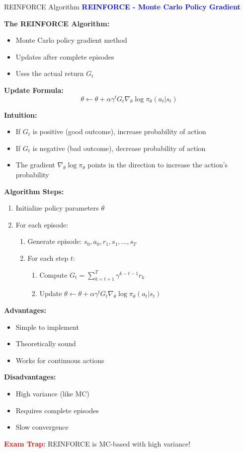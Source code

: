 \documentclass[8pt]{beamer}
\begin{document}
\begin{frame}{REINFORCE Algorithm}
\fontsize{6.5}{7.5}\selectfont
\textcolor{blue}{\textbf{REINFORCE - Monte Carlo Policy Gradient}}

\textbf{The REINFORCE Algorithm:}
\begin{itemize}
\item Monte Carlo policy gradient method
\item Updates after complete episodes
\item Uses the actual return $G_t$
\end{itemize}

\textbf{Update Formula:}
\[
\theta \leftarrow \theta + \alpha \gamma^t G_t \nabla_\theta \log \pi_\theta(a_t|s_t)
\]

\textbf{Intuition:}
\begin{itemize}
\item If $G_t$ is positive (good outcome), increase probability of action
\item If $G_t$ is negative (bad outcome), decrease probability of action
\item The gradient $\nabla_\theta \log \pi_\theta$ points in the direction to increase the action's probability
\end{itemize}

\textbf{Algorithm Steps:}
\begin{enumerate}
\item Initialize policy parameters $\theta$
\item For each episode:
\begin{enumerate}
\item Generate episode: $s_0, a_0, r_1, s_1, ..., s_T$
\item For each step $t$:
\begin{enumerate}
\item Compute $G_t = \sum_{k=t+1}^T \gamma^{k-t-1} r_k$
\item Update $\theta \leftarrow \theta + \alpha \gamma^t G_t \nabla_\theta \log \pi_\theta(a_t|s_t)$
\end{enumerate}
\end{enumerate}
\end{enumerate}

\textbf{Advantages:}
\begin{itemize}
\item Simple to implement
\item Theoretically sound
\item Works for continuous actions
\end{itemize}

\textbf{Disadvantages:}
\begin{itemize}
\item High variance (like MC)
\item Requires complete episodes
\item Slow convergence
\end{itemize}

\textcolor{red}{\textbf{Exam Trap:}} REINFORCE is MC-based with high variance!
\end{frame}
\end{document}
